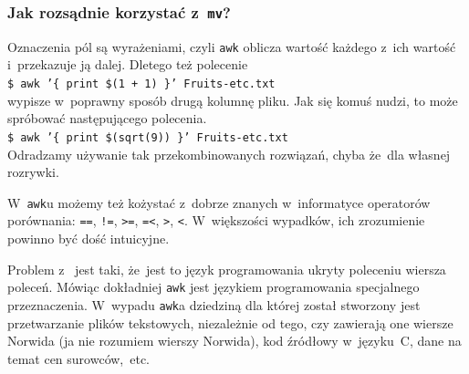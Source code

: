 \documentclass[10pt,t]{beamer}
\begin{document}
\begin{frame}
  \frametitle{Jak rozsądnie korzystać z~\texttt{mv}?}


  Oznaczenia pól są \alert{wyrażeniami}, czyli \texttt{awk} oblicza
  wartość każdego z~ich wartość i~przekazuje ją dalej. Dletego też
  polecenie \\
  \texttt{\$ awk '\{ print \$(1 + 1) \}' Fruits-etc.txt} \\
  wypisze w~poprawny sposób drugą kolumnę pliku. Jak się komuś nudzi, to
  może spróbować następującego polecenia. \\
  \texttt{\$ awk '\{ print \$(sqrt(9)) \}' Fruits-etc.txt} \\
  Odradzamy używanie tak przekombinowanych rozwiązań, chyba że~dla własnej
  rozrywki.

  W~\texttt{awk}u możemy też kożystać z~dobrze  znanych w~informatyce
  operatorów porównania: \texttt{==}, \texttt{!=}, \texttt{>=}, \texttt{=<},
  \texttt{>}, \texttt{<}. W~większości wypadków, ich zrozumienie powinno być
  dość intuicyjne.

  Problem z~
  jest taki, że~jest to język programowania ukryty poleceniu wiersza
  poleceń. Mówiąc dokładniej \texttt{awk} jest językiem programowania
  specjalnego przeznaczenia. W~wypadu \texttt{awk}a dziedziną dla której
  został stworzony jest przetwarzanie plików tekstowych, niezależnie od
  tego, czy zawierają one wiersze Norwida (ja nie rozumiem wierszy
  Norwida), kod źródłowy w~języku~C, dane na temat cen surowców,~etc.

\end{frame}
\end{document}
